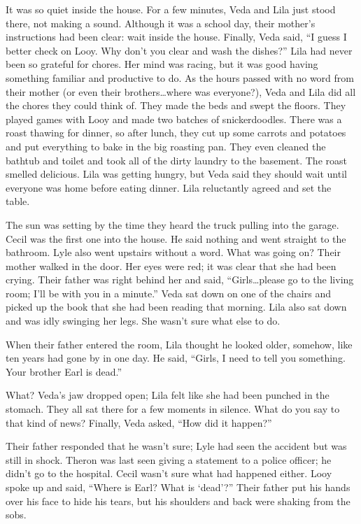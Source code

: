 \documentclass[
  american,
  letterpaper,
]{book}
\begin{document}
It was so quiet inside the house. For a few minutes, Veda and Lila just
stood there, not making a sound. Although it was a school day, their
mother's instructions had been clear: wait inside the house. Finally,
Veda said, ``I guess I better check on Looy. Why don't you clear and
wash the dishes?'' Lila had never been so grateful for chores. Her mind
was racing, but it was good having something familiar and productive to
do. As the hours passed with no word from their mother (or even their
brothers\ldots where was everyone?), Veda and Lila did all the chores
they could think of. They made the beds and swept the floors. They
played games with Looy and made two batches of snickerdoodles. There was
a roast thawing for dinner, so after lunch, they cut up some carrots and
potatoes and put everything to bake in the big roasting pan. They even
cleaned the bathtub and toilet and took all of the dirty laundry to the
basement. The roast smelled delicious. Lila was getting hungry, but Veda
said they should wait until everyone was home before eating dinner. Lila
reluctantly agreed and set the table.

The sun was setting by the time they heard the truck pulling into the
garage. Cecil was the first one into the house. He said nothing and went
straight to the bathroom. Lyle also went upstairs without a word. What
was going on? Their mother walked in the door. Her eyes were red; it was
clear that she had been crying. Their father was right behind her and
said, ``Girls\ldots please go to the living room; I'll be with you in a
minute.'' Veda sat down on one of the chairs and picked up the book that
she had been reading that morning. Lila also sat down and was idly
swinging her legs. She wasn't sure what else to do.

When their father entered the room, Lila thought he looked older,
somehow, like ten years had gone by in one day. He said, ``Girls, I need
to tell you something. Your brother Earl is dead.''

What? Veda's jaw dropped open; Lila felt like she had been punched in
the stomach. They all sat there for a few moments in silence. What do
you say to that kind of news? Finally, Veda asked, ``How did it
happen?''

Their father responded that he wasn't sure; Lyle had seen the accident
but was still in shock. Theron was last seen giving a statement to a
police officer; he didn't go to the hospital. Cecil wasn't sure what had
happened either. Looy spoke up and said, ``Where is Earl? What is
`dead'?'' Their father put his hands over his face to hide his tears,
but his shoulders and back were shaking from the sobs.
\end{document}
